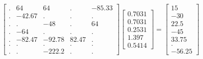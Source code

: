 \begin{equation}
\begin{bmatrix}
. & 64 & 64 & . & -85.33 \\
. & -42.67 & . & . & . \\
. & . & -48 & . & 64 \\
. & -64 & . & . & . \\
. & -82.47 & -92.78 & 82.47 & . \\
. & . & . & . & . \\
. & . & -222.2 & . & .
\end{bmatrix}
\begin{bmatrix}
0.7031 \\
0.7031 \\
0.2531 \\
1.397 \\
0.5414
\end{bmatrix}=
\begin{bmatrix}
15 \\
-30 \\
22.5 \\
-45 \\
33.75 \\
. \\
-56.25
\end{bmatrix}
\end{equation}